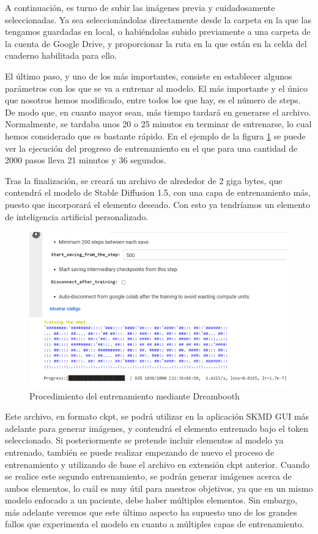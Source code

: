 A continuación, es turno de subir las imágenes previa y cuidadosamente seleccionadas. Ya sea seleccionándolas directamente desde la carpeta en la que las tengamos guardadas en local, o habiéndolas subido previamente a una carpeta de la cuenta de Google Drive, y proporcionar la ruta en la que están en la celda del cuaderno habilitada para ello. 

El último paso, y uno de los más importantes, consiste en establecer algunos parámetros con los que se va a entrenar al modelo. El más importante y el único que nosotros hemos modificado, entre todos los que hay, es el número de steps. De modo que, en cuanto mayor sean, más tiempo tardará en generarse el archivo. Normalmente, se tardaba unos 20 o 25 minutos en terminar de entrenarse, lo cual hemos considerado que es bastante rápido. En el ejemplo de la figura \ref{fig:dreambooth} se puede ver la ejecución del progreso de entrenamiento en el que para una cantidad de 2000 pasos lleva 21 minutos y 36 segundos. 

Tras la finalización, se creará un archivo de alrededor de 2 giga bytes, que contendrá el modelo de Stable Diffusion 1.5, con una capa de entrenamiento más, puesto que incorporará el elemento deseado. Con esto ya tendríamos un elemento de inteligencia artificial personalizado.\\

\begin{figure}[h]
	\centering
	\includegraphics[width = 1
	\textwidth]{Imagenes/Vectorial/dreambooth.png}
	\caption{Procedimiento del entrenamiento mediante Dreambooth}
	\label{fig:dreambooth}
\end{figure}

Este archivo, en formato ckpt, se podrá utilizar en la aplicación SKMD GUI más adelante para generar imágenes, y contendrá el elemento entrenado bajo el token seleccionado. Si posteriormente se pretende incluir elementos al modelo ya entrenado, también se puede realizar empezando de nuevo el proceso de entrenamiento y utilizando de base el archivo en extensión ckpt anterior. Cuando se realice este segundo entrenamiento, se podrán generar imágenes acerca de ambos elementos, lo cuál es muy útil para nuestros objetivos, ya que en un mismo modelo enfocado a un paciente, debe haber múltiples elementos. Sin embargo, más adelante veremos que este último aspecto ha supuesto uno de los grandes fallos que experimenta el modelo en cuanto a múltiples capas de entrenamiento. \\

